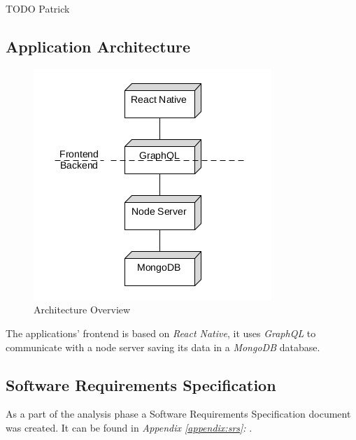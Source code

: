 TODO Patrick

\subsection{Application Architecture}
\label{ssec:application_architecture}

\begin{figure}[H]
    \begin{center}
        \includegraphics[width=\textwidth/2]{images/overview.png}
        \caption{Architecture Overview}
        \label{fig:architecture_overview}
    \end{center}
\end{figure}

The applications' frontend is based on \textit{React Native}, it uses \textit{GraphQL} to communicate with a node server saving its data in a \textit{MongoDB} database.

\subsection{Software Requirements Specification}
\label{ssec:software_requirements_specification}

As a part of the analysis phase a Software Requirements Specification document was created. It can be found in \textit{Appendix \ref{appendix:srs}: }.